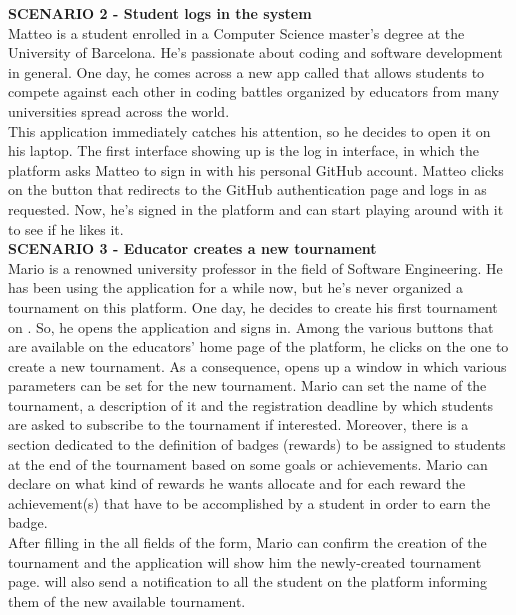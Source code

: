     \textbf{SCENARIO 2 - Student logs in the system} \\
    Matteo is a student enrolled in a Computer Science master's degree at the University of Barcelona. He's passionate about coding and software development in general. One day, he comes across a new app called \app that allows students to compete against each other in coding battles organized by educators from many universities spread across the world.  \\
    This application immediately catches his attention, so he decides to open it on his laptop. The first interface showing up is the log in interface, in which the \app platform asks Matteo to sign in with his personal GitHub account. Matteo clicks on the button that redirects to the GitHub authentication page and logs in as requested.
    Now, he's signed in the platform and can start playing around with it to see if he likes it.\\
    
    \textbf{SCENARIO 3 - Educator creates a new tournament}\\
    Mario is a renowned university professor in the field of Software Engineering. He has been using the \app application for a while now, but he's never organized a tournament on this platform.
    One day, he decides to create his first tournament on \app. So, he opens the application and signs in. Among the various buttons that are available on the educators' home page of the platform, he clicks on the one to create a new tournament. As a consequence, \app opens up a window in which various parameters can be set for the new tournament. Mario can set the name of the tournament, a description of it and the registration deadline by which students are asked to subscribe to the tournament if interested. Moreover, there is a section dedicated to the definition of badges (rewards) to be assigned to students at the end of the tournament based on some goals or achievements. Mario can declare on \app what kind of rewards he wants allocate and for each reward the achievement(s) that have to be accomplished by a student in order to earn the badge.\\
    After filling in the all fields of the form, Mario can confirm the creation of the tournament and the application will show him the newly-created tournament page.
    \app will also send a notification to all the student on the platform informing them of the new available tournament.\\

